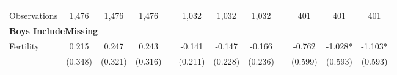\begin{landscape}
\begin{table}[htpb!]
\begin{center}
\begin{tabular}{lcccp{2mm}cccp{2mm}ccc}
\begin{footnotesize}\end{footnotesize}&\begin{footnotesize}\end{footnotesize}&\begin{footnotesize}\end{footnotesize}&\begin{footnotesize}\end{footnotesize}&\begin{footnotesize}\end{footnotesize}&\begin{footnotesize}\end{footnotesize}&\begin{footnotesize}\end{footnotesize}&\begin{footnotesize}\end{footnotesize}&\begin{footnotesize}\end{footnotesize}&\begin{footnotesize}\end{footnotesize}&\begin{footnotesize}\end{footnotesize}&\begin{footnotesize}\end{footnotesize}\\Observations&1,476&1,476&1,476&&1,032&1,032&1,032&&401&401&401\\
\multicolumn{12}{l}{\textbf{Boys IncludeMissing}}\\ 
Fertility&0.215&0.247&0.243&&-0.141&-0.147&-0.166&&-0.762&-1.028*&-1.103*\\
&(0.348)&(0.321)&(0.316)&&(0.211)&(0.228)&(0.236)&&(0.599)&(0.593)&(0.593)\\

\end{tabular}
\end{center}
\end{table}
\end{landscape}
